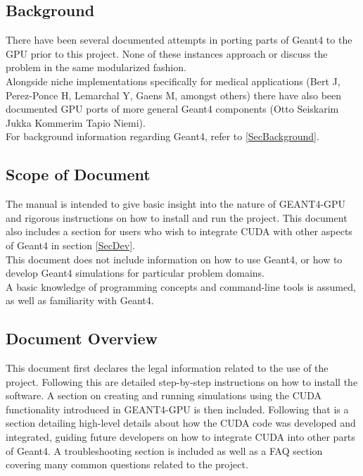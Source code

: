 \documentclass[12pt]{article}
\begin{document}
\subsection{Background} %
There have been several documented attempts in porting parts of Geant4 to the GPU prior to this project. None of these instances approach or discuss the problem in the same modularized fashion.\\

Alongside niche implementations specifically for medical applications (Bert J, Perez-Ponce H, Lemarchal Y, Gaens M, amongst others) there have also been documented GPU ports of more general Geant4 components (Otto Seiskarim Jukka Kommerim Tapio Niemi).\\

For background information regarding Geant4, refer to \ref{SecBackground}.

\subsection{Scope of Document} %
The manual is intended to give basic insight into the nature of GEANT4-GPU and rigorous instructions on how to install and run the project. This document also includes a section for users who wish to integrate CUDA with other aspects of Geant4 in section \ref{SecDev}.\\

This document does not include information on how to use Geant4, or how to develop Geant4 simulations for particular problem domains.\\

A basic knowledge of programming concepts and command-line tools is assumed, as well as familiarity with Geant4.

\subsection{Document Overview} %
This document first declares the legal information related to the use of the project. Following this are detailed step-by-step instructions on how to install the software. A section on creating and running simulations using the CUDA functionality introduced in GEANT4-GPU is then included. Following that is a section detailing high-level details about how the CUDA code was developed and integrated, guiding future developers on how to integrate CUDA into other parts of Geant4. A troubleshooting section is included as well as a FAQ section covering many common questions related to the project.
\end{document}
